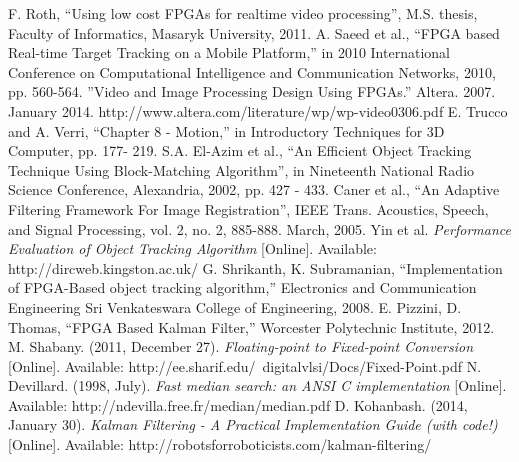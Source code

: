 \documentclass[12pt]{article} %
\begin{document}
\begin{thebibliography}{11}
F. Roth, “Using low cost FPGAs for realtime video processing”, M.S. thesis, Faculty of Informatics, Masaryk University, 2011.
A. Saeed et al., “FPGA based Real-time Target Tracking on a Mobile Platform,” in 2010 International Conference on Computational Intelligence and Communication Networks, 2010, pp. 560-564.
”Video and Image Processing Design Using FPGAs.” Altera. 2007. January 2014. 
http://www.altera.com/literature/wp/wp-video0306.pdf  
E. Trucco and A. Verri, “Chapter 8 - Motion,” in Introductory Techniques for 3D Computer, pp. 177- 219.
S.A. El-Azim et al., “An Efficient Object Tracking Technique Using Block-Matching Algorithm”, in Nineteenth National Radio Science Conference, Alexandria, 2002, pp. 427 - 433.
Caner et al., “An Adaptive Filtering Framework For Image Registration”, IEEE Trans. Acoustics, Speech, and Signal Processing, vol. 2, no. 2, 885-888. March, 2005. 
Yin et al. \textit{Performance Evaluation of Object Tracking Algorithm} [Online]. Available: http://dircweb.kingston.ac.uk/ 
G. Shrikanth, K. Subramanian, “Implementation of FPGA-Based object tracking algorithm,” Electronics and Communication Engineering Sri Venkateswara College of Engineering, 2008.
E. Pizzini, D. Thomas, “FPGA Based Kalman Filter,” Worcester Polytechnic Institute, 2012.
M. Shabany. (2011, December 27). \textit{Floating-point to Fixed-point Conversion} [Online]. Available: http://ee.sharif.edu/~digitalvlsi/Docs/Fixed-Point.pdf
N. Devillard. (1998, July). \textit{Fast median search: an ANSI C implementation} [Online]. Available: http://ndevilla.free.fr/median/median.pdf
D. Kohanbash. (2014, January 30). \textit{Kalman Filtering - A Practical Implementation Guide (with code!)} [Online]. Available: http://robotsforroboticists.com/kalman-filtering/
\end{thebibliography}
\newpage
\appendix
\appendixpage
\end{document}
